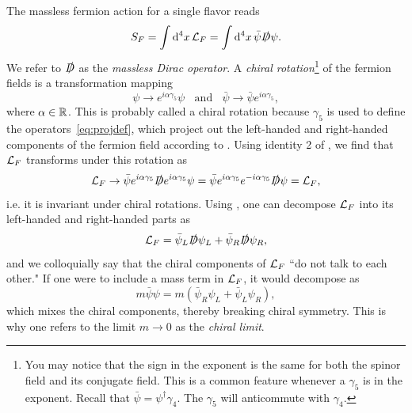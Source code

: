 The massless fermion action for a single flavor reads
\begin{equation}
S_F=\int\dd[4]{x}\mathcal{L}_F=\int\dd[4]{x}\bar{\psi}\slashed{D}\psi. 
\end{equation}
We refer to $\slashed{D}$ as the {\it massless Dirac operator}. A
{\it chiral rotation}\footnote{You may notice that the sign in the exponent
is the same for both the spinor field and its conjugate field. This is a
common feature whenever a $\gamma_5$ is in the exponent. Recall that
$\bar{\psi}=\psi^\dagger\gamma_4$. The $\gamma_5$ will anticommute with
$\gamma_4$.} of the fermion fields is a transformation
mapping
\begin{equation}\label{eq:chiralRotation}
  \psi\to e^{i\alpha\gamma_5}\psi~~~~\text{and}~~~~
  \bar{\psi}\to\bar\psi e^{i\alpha\gamma_5},
\end{equation}
where $\alpha\in\mathbb{R}$. This is probably called a chiral rotation
because $\gamma_5$ is used to define the operators~\eqref{eq:projdef},
which project out the left-handed and right-handed components of the
fermion field according to . Using identity 2 of
, we find that $\mathcal{L}_F$ transforms under this
rotation as
\begin{equation}
  \mathcal{L}_F\to\bar{\psi}e^{i\alpha\gamma_5}\slashed{D}e^{i\alpha\gamma_5}\psi
         =\bar{\psi}e^{i\alpha\gamma_5}e^{-i\alpha\gamma_5}\slashed{D}\psi
         =\mathcal{L}_F,
\end{equation}
i.e. it is invariant under chiral rotations. Using
, one can decompose $\mathcal{L}_F$ into its
left-handed and right-handed parts as
\begin{equation}
  \mathcal{L}_F=\bar{\psi}_L\slashed{D}\psi_L
         +\bar{\psi}_R\slashed{D}\psi_R,
\end{equation}
and we colloquially say that the chiral components of
$\mathcal{L}_F$ ``do not talk to each other."
If one were to include a mass term in $\mathcal{L}_F$, it would decompose as
\begin{equation}
  m\bar{\psi}\psi=m\left(\bar{\psi}_R\psi_L+\bar{\psi}_L\psi_R\right),
\end{equation}
which mixes the chiral components, thereby breaking chiral symmetry.
This is why one refers to the limit $m\to0$ as the {\it chiral limit}.





